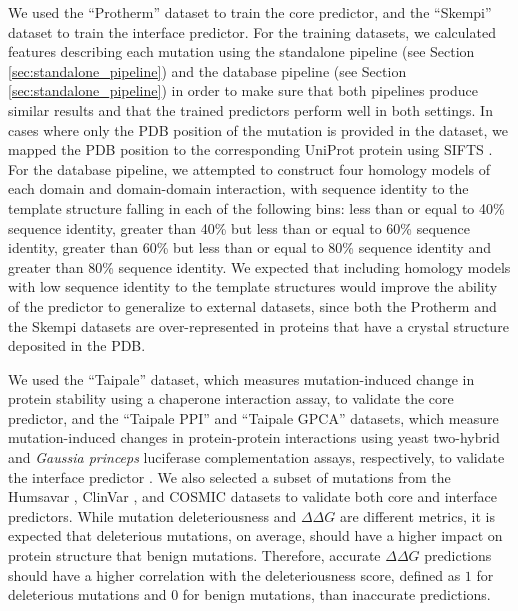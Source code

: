 We used the ``Protherm'' dataset to train the core predictor, and the ``Skempi'' dataset to train the interface predictor. For the training datasets, we calculated features describing each mutation using the standalone pipeline (see Section \ref{sec:standalone_pipeline}) and the database pipeline (see Section \ref{sec:standalone_pipeline}) in order to make sure that both pipelines produce similar results and that the trained predictors perform well in both settings. In cases where only the PDB position of the mutation is provided in the dataset, we mapped the PDB position to the corresponding UniProt protein using SIFTS \cite{velankar_sifts:_2013}. For the database pipeline, we attempted to construct four homology models of each domain and domain-domain interaction, with sequence identity to the template structure falling in each of the following bins: less than or equal to 40\% sequence identity, greater than 40\% but less than or equal to 60\% sequence identity, greater than 60\% but less than or equal to 80\% sequence identity and greater than 80\% sequence identity. We expected that including homology models with low sequence identity to the template structures would improve the ability of the predictor to generalize to external datasets, since both the Protherm and the Skempi datasets are over-represented in proteins that have a crystal structure deposited in the PDB.

We used the ``Taipale'' dataset, which measures mutation-induced change in protein stability using a chaperone interaction assay, to validate the core predictor, and the ``Taipale PPI'' and ``Taipale GPCA'' datasets, which measure mutation-induced changes in protein-protein interactions using yeast two-hybrid and \textit{Gaussia princeps} luciferase complementation assays, respectively, to validate the interface predictor \cite{sahni_widespread_2015}. We also selected a subset of mutations from the Humsavar \cite{consortium_uniprot:_2015}, ClinVar \cite{landrum_clinvar:_2016}, and COSMIC \cite{forbes_cosmic:_2015} datasets to validate both core and interface predictors. While mutation deleteriousness and $\Delta \Delta G$ are different metrics, it is expected that deleterious mutations, on average, should have a higher impact on protein structure that benign mutations. Therefore, accurate $\Delta \Delta G$ predictions should have a higher correlation with the deleteriousness score, defined as $1$ for deleterious mutations and $0$ for benign mutations, than inaccurate predictions.

